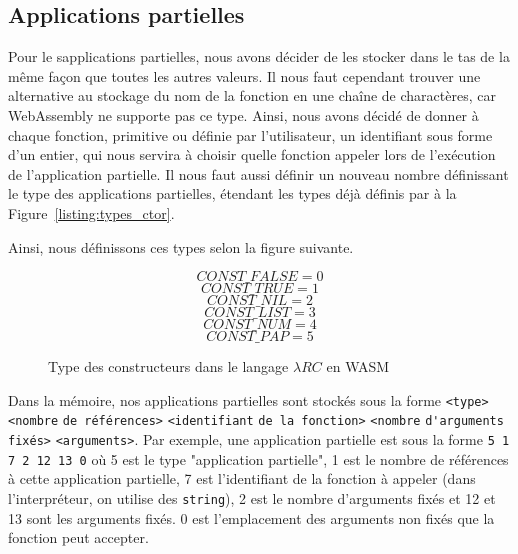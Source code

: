 \documentclass{rapportECL}
\begin{document}
\subsection{Applications partielles}

Pour le sapplications partielles, nous avons décider de les stocker dans le tas de la même façon que toutes les autres valeurs.
Il nous faut cependant trouver une alternative au stockage du nom de la fonction en une chaîne de charactères, car WebAssembly
ne supporte pas ce type. Ainsi, nous avons décidé de donner à chaque fonction, primitive ou définie par l'utilisateur, un identifiant
sous forme d'un entier, qui nous servira à choisir quelle fonction appeler lors de l'exécution de l'application partielle.
Il nous faut aussi définir un nouveau nombre définissant le type des applications partielles, étendant les types déjà définis
par à la Figure~\ref{listing:types_ctor}.

\medskip

Ainsi, nous définissons ces types selon la figure suivante.


\begin{figure}[H]
	\begin{equation*}
	CONST\_FALSE = 0
	\end{equation*}
	\begin{equation*}
	CONST\_TRUE = 1
	\end{equation*}
	\begin{equation*}
	CONST\_NIL = 2
	\end{equation*}
	\begin{equation*}
	CONST\_LIST = 3
	\end{equation*}
	\begin{equation*}
	CONST\_NUM = 4
	\end{equation*}
	\begin{equation*}
	CONST\_PAP = 5
	\end{equation*}
	\caption{Type des constructeurs dans le langage $\lambda{RC}$ en WASM}
	\label{listing:types_ctor_wasm}
	\end{figure}
	\FloatBarrier 

\medskip

Dans la mémoire, nos applications partielles sont stockés sous la forme 
\verb|<type>| \verb|<nombre| \verb|de références>| \verb|<identifiant| \verb|de la fonction>| \verb|<nombre| \verb|d'arguments| \verb|fixés>| \verb|<arguments>|. 
Par exemple, une application partielle est sous la forme \verb|5 1 7 2 12 13 0| où 5 est le type "application partielle", 
1 est le nombre de références à cette application partielle, 
7 est l'identifiant de la fonction à appeler (dans l'interpréteur, on utilise des \verb|string|), 
2 est le nombre d'arguments fixés et 12 et 13 sont les arguments fixés.
0 est l'emplacement des arguments non fixés que la fonction peut accepter.
\end{document}
